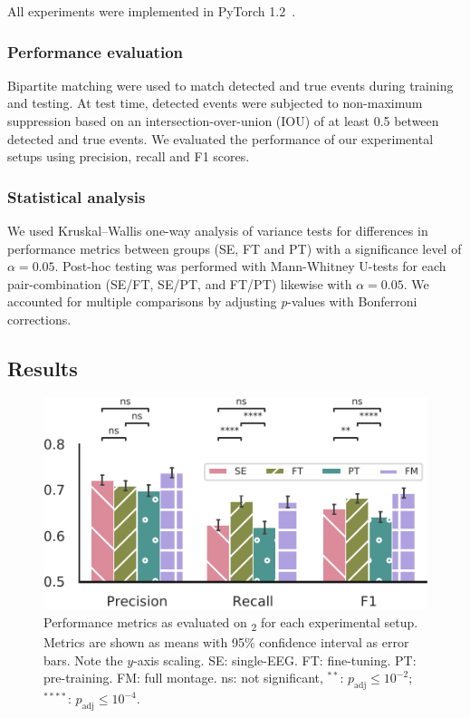All experiments were implemented in PyTorch 1.2~\cite{Paszke2019}.

\subsubsection{Performance evaluation}
Bipartite matching were used to match detected and true events during training and testing.
At test time, detected events were subjected to non-maximum suppression based on an intersection-over-union (IOU) of at least 0.5 between detected and true events.
We evaluated the performance of our experimental setups using precision, recall and F1 scores.

\subsubsection{Statistical analysis}
We used Kruskal–Wallis one-way analysis of variance tests for differences in performance metrics between groups (SE, FT and PT) with a significance level of $\alpha=0.05$.
Post-hoc testing was performed with Mann-Whitney U-tests for each pair-combination (SE/FT, SE/PT, and FT/PT) likewise with $\alpha=0.05$.
We accounted for multiple comparisons by adjusting \textit{p}-values with Bonferroni corrections.


\subsection{Results}
\begin{figure}[tb]
    \centering
    \includegraphics[width=\columnwidth]{figures/paper-v/paperv-figure01.pdf}
    \caption[MSED-TL performance on \test\textsubscript{2}]{Performance metrics as evaluated on \test\textsubscript{2} for each experimental setup. Metrics are shown as means with 95\% confidence interval as error bars. Note the $y$-axis scaling. SE: single-EEG. FT: fine-tuning. PT: pre-training. FM: full montage. ns: not significant, $^{**}$: $p_{\mathrm{adj}} \leq 10^{-2}$; $^{****}$: $p_{\mathrm{adj}} \leq 10^{-4}$.}
    \label{fig:paperv-figure01}
\end{figure}

